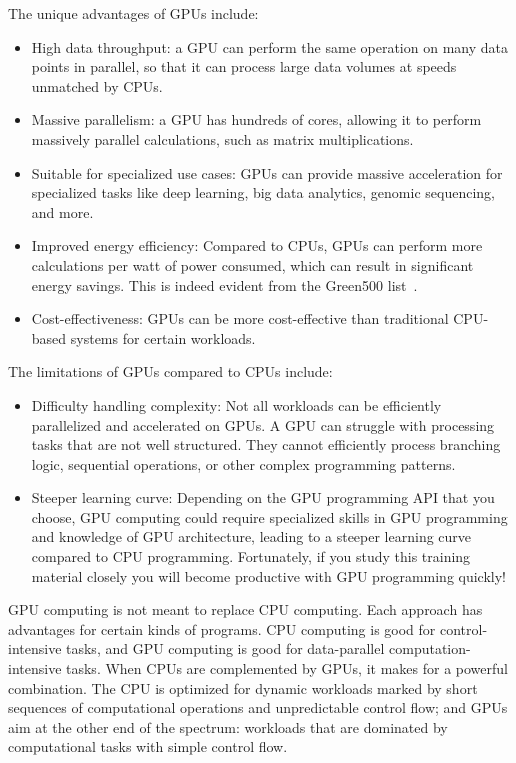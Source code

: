 The unique advantages of GPUs include:
\begin{itemize}
    \item High data throughput: a GPU can perform the same operation on many data points in parallel, so that it can process large data volumes at speeds unmatched by CPUs.
    \item Massive parallelism: a GPU has hundreds of cores, allowing it to perform massively parallel calculations, such as matrix multiplications.
    \item Suitable for specialized use cases: GPUs can provide massive acceleration for specialized tasks like deep learning, big data analytics, genomic sequencing, and more.
    \item Improved energy efficiency: Compared to CPUs, GPUs can perform more calculations per watt of power consumed, which can result in significant energy savings. This is indeed evident from the Green500 list~\cite{green500}.
    \item Cost-effectiveness: GPUs can be more cost-effective than traditional CPU-based systems for certain workloads.
\end{itemize}


The limitations of GPUs compared to CPUs include:
\begin{itemize}
    \item Difficulty handling complexity: Not all workloads can be efficiently parallelized and accelerated on GPUs. A GPU can struggle with processing tasks that are not well structured. They cannot efficiently process branching logic, sequential operations, or other complex programming patterns. %
    \item Steeper learning curve: Depending on the GPU programming API that you choose, GPU computing could require specialized skills in GPU programming and knowledge of GPU architecture, leading to a steeper learning curve compared to CPU programming. Fortunately, if you study this training material closely you will become productive with GPU programming quickly!
\end{itemize}


\par
GPU computing is not meant to replace CPU computing.
Each approach has advantages for certain kinds of programs.
CPU computing is good for control-intensive tasks, and GPU computing is good for data-parallel computation-intensive tasks.
When CPUs are complemented by GPUs, it makes for a powerful combination.
The CPU is optimized for dynamic workloads marked by short sequences of computational operations and unpredictable control flow; and GPUs aim at the other end of the spectrum: workloads that are dominated by computational tasks with simple control flow. 



